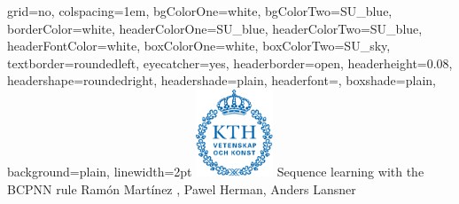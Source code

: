 \documentclass[portrait,final]{baposter}
\begin{document}

\newlength{\leftimgwidth}
\begin{poster}%
  {
  grid=no,
  colspacing=1em,
  bgColorOne=white,
  bgColorTwo=SU_blue,
  borderColor=white,
  headerColorOne=SU_blue,
  headerColorTwo=SU_blue,
  headerFontColor=white,
  boxColorOne=white, %
  boxColorTwo=SU_sky,
  textborder=roundedleft,
  eyecatcher=yes,
  headerborder=open,
  headerheight=0.08\textheight,
  headershape=roundedright,
  headershade=plain,
  headerfont=\Large\textsf, %
  boxshade=plain,
  background=plain,
  linewidth=2pt
  }
  {\includegraphics[height=7em]{Kth_logo.png}} %
  {\sf %
  \color{black} Sequence learning with the BCPNN rule}
  {\sf %
  \vspace{0.5em}
  \color{SU_fire} Ram\'on Mart\'inez , Pawel Herman, Anders Lansner
  }
  {%
  }


\end{poster}
\end{document}
